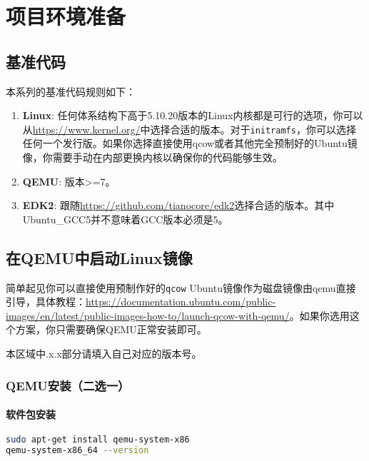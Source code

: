 \chapter{项目环境准备}

\section{基准代码}
本系列的基准代码规则如下：
\begin{enumerate}
    \item \textbf{Linux}: 任何体系结构下高于5.10.20版本的Linux内核都是可行的选项，你可以从\url{https://www.kernel.org/}中选择合适的版本。对于\texttt{initramfs}，你可以选择任何一个发行版。如果你选择直接使用qcow或者其他完全预制好的Ubuntu镜像，你需要手动在内部更换内核以确保你的代码能够生效。
    \item \textbf{QEMU}: 版本>=7。
    \item \textbf{EDK2}: 跟随\url{https://github.com/tianocore/edk2}选择合适的版本。其中Ubuntu\_GCC5并不意味着GCC版本必须是5。
\end{enumerate}

\section{在QEMU中启动Linux镜像}
\begin{remark}
简单起见你可以直接使用预制作好的\texttt{qcow} Ubuntu镜像作为磁盘镜像由qemu直接引导，具体教程：\url{https://documentation.ubuntu.com/public-images/en/latest/public-images-how-to/launch-qcow-with-qemu/}。如果你选用这个方案，你只需要确保QEMU正常安装即可。
\end{remark}

\begin{remark}
    本区域中.x.x部分请填入自己对应的版本号。
\end{remark}



\subsection{QEMU安装（二选一）}
\subsubsection{软件包安装}
\begin{lstlisting}[language=bash]
sudo apt-get install qemu-system-x86
qemu-system-x86_64 --version
\end{lstlisting}

